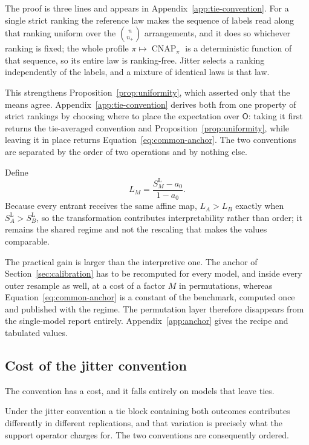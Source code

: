 \documentclass[11pt]{article}
\newcommand{\CNAP}{\operatorname{CNAP}}
\newcommand{\Rank}{\mathsf{O}}
\newcommand{\SLead}{S^{\mathrm{L}}}
\theoremstyle{remark}
\begin{document}
The proof is three lines and appears in Appendix~\ref{app:tie-convention}. For a single strict ranking the reference law makes the sequence of labels read along that ranking uniform over the $\binom{n}{n_+}$ arrangements, and it does so whichever ranking is fixed; the whole profile $\pi\mapsto\CNAP_\pi$ is a deterministic function of that sequence, so its entire law is ranking-free. Jitter selects a ranking independently of the labels, and a mixture of identical laws is that law.

This strengthens Proposition~\ref{prop:uniformity}, which asserted only that the means agree. Appendix~\ref{app:tie-convention} derives both from one property of strict rankings by choosing where to place the expectation over $\Rank$: taking it first returns the tie-averaged convention and Proposition~\ref{prop:uniformity}, while leaving it in place returns Equation~\eqref{eq:common-anchor}. The two conventions are separated by the order of two operations and by nothing else.

Define
\begin{equation}
L_M
=
\frac{\SLead_M-a_0}{1-a_0}.
\label{eq:leaderboard}
\end{equation}
Because every entrant receives the same affine map, $L_A>L_B$ exactly when $\SLead_A>\SLead_B$, so the transformation contributes interpretability rather than order; it remains the shared regime and not the rescaling that makes the values comparable.

The practical gain is larger than the interpretive one. The anchor of Section~\ref{sec:calibration} has to be recomputed for every model, and inside every outer resample as well, at a cost of a factor $M$ in permutations, whereas Equation~\eqref{eq:common-anchor} is a constant of the benchmark, computed once and published with the regime. The permutation layer therefore disappears from the single-model report entirely. Appendix~\ref{app:anchor} gives the recipe and tabulated values.

\subsection{Cost of the jitter convention}
\label{sec:jitter-cost}

The convention has a cost, and it falls entirely on models that leave ties.

Under the jitter convention a tie block containing both outcomes contributes differently in different replications, and that variation is precisely what the support operator charges for. The two conventions are consequently ordered.
\end{document}
